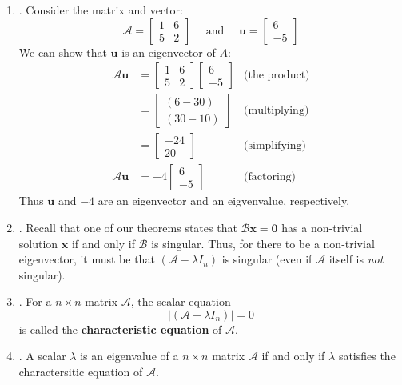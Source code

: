 \documentclass[12pt]{article}
\begin{document}
\begin{enumerate}
\begin{enumerate}
	\item\underline{}.
		Consider the matrix and vector:
			\[\mathcal{A}=\begin{bmatrix}1&6\\5&2\end{bmatrix}\quad\text{ and }\quad\mathbf{u}=\begin{bmatrix}6\\-5\end{bmatrix}\]
		We can show that $\textbf{u}$ is an eigenvector of $A$:
			\begin{align*}
				\mathcal{A}\textbf{u} & = \begin{bmatrix}1&6\\5&2\end{bmatrix}\begin{bmatrix}6\\-5\end{bmatrix}
						&\text{(the product)}\\[5pt]
				&=\begin{bmatrix}(6-30)\\(30-10)\end{bmatrix}
						&\text{(multiplying)}\\[5pt]
				&=\begin{bmatrix}-24\\20\end{bmatrix}
						&\text{(simplifying)}\\[5pt]
				\mathcal{A}\textbf{u}&=-4\begin{bmatrix}6\\-5\end{bmatrix}
						&\text{(factoring)}
			\end{align*}
		Thus $\textbf{u}$ and $-4$ are an eigenvector and an eigvenvalue, respectively.

	\item\underline{}.
		Recall that one of our theorems states that $\mathcal{B}\textbf{x}=\textbf{0}$ has a non-trivial solution $\textbf{x}$ if and only if $\mathcal{B}$ is singular. Thus, for there to be a non-trivial eigenvector, it must be that $(\mathcal{A}-\lambda I_n)$ is singular (even if $\mathcal{A}$ itself is \emph{not} singular). 

	\item\underline{}.
		For a $n\times n$ matrix $\mathcal{A}$, the scalar equation
			\[|(\mathcal{A}-\lambda I_n)|=0\]
		is called the \textbf{characteristic equation} of $\mathcal{A}$.

	\item\underline{}.
		A scalar $\lambda$ is an eigenvalue of a $n\times n$ matrix $\mathcal{A}$ if and only if $\lambda$ satisfies the charactersitic equation of $\mathcal{A}$.


\end{enumerate}
\end{enumerate}
\end{document}
